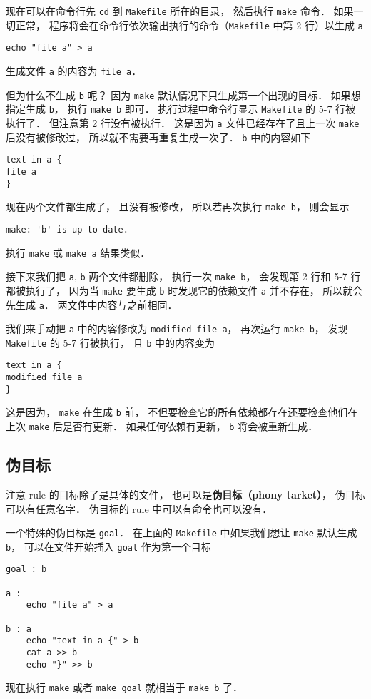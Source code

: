 现在可以在命令行先 \lstinline|cd| 到 \lstinline|Makefile| 所在的目录， 然后执行 \lstinline|make| 命令． 如果一切正常， 程序将会在命令行依次输出执行的命令（\lstinline|Makefile| 中第 2 行）以生成 \lstinline|a|
\begin{lstlisting}
echo "file a" > a
\end{lstlisting}
生成文件 \lstinline|a| 的内容为 \lstinline|file a|．

但为什么不生成 \lstinline|b| 呢？ 因为 \lstinline|make| 默认情况下只生成第一个出现的目标． 如果想指定生成 \lstinline|b|， 执行 \lstinline|make b| 即可． 执行过程中命令行显示 \lstinline|Makefile| 的 5-7 行被执行了． 但注意第 2 行没有被执行． 这是因为 \lstinline|a| 文件已经存在了且上一次 \lstinline|make| 后没有被修改过， 所以就不需要再重复生成一次了． \lstinline|b| 中的内容如下
\begin{lstlisting}
text in a {
file a
}
\end{lstlisting}

现在两个文件都生成了， 且没有被修改， 所以若再次执行 \lstinline|make b|， 则会显示
\begin{lstlisting}
make: 'b' is up to date.
\end{lstlisting}
执行 \lstinline|make| 或 \lstinline|make a| 结果类似．

接下来我们把 \lstinline|a|, \lstinline|b| 两个文件都删除， 执行一次 \lstinline|make b|， 会发现第 2 行和 5-7 行都被执行了， 因为当 \lstinline|make| 要生成 \lstinline|b| 时发现它的依赖文件 \lstinline|a| 并不存在， 所以就会先生成 \lstinline|a|． 两文件中内容与之前相同．

我们来手动把 \lstinline|a| 中的内容修改为 \lstinline|modified file a|， 再次运行 \lstinline|make b|， 发现 \lstinline|Makefile| 的 5-7 行被执行， 且 \lstinline|b| 中的内容变为
\begin{lstlisting}
text in a {
modified file a
}
\end{lstlisting}
这是因为， \lstinline|make| 在生成 \lstinline|b| 前， 不但要检查它的所有依赖都存在还要检查他们在上次 \lstinline|make| 后是否有更新． 如果任何依赖有更新， \lstinline|b| 将会被重新生成．

\subsection{伪目标}
注意 rule 的目标除了是具体的文件， 也可以是\textbf{伪目标（phony tarket）}， 伪目标可以有任意名字． 伪目标的 rule 中可以有命令也可以没有．

一个特殊的伪目标是 \lstinline|goal|． 在上面的 \lstinline|Makefile| 中如果我们想让 \lstinline|make| 默认生成 \lstinline|b|， 可以在文件开始插入 \lstinline|goal| 作为第一个目标
\begin{lstlisting}
goal : b

a :
	echo "file a" > a

b : a
	echo "text in a {" > b
	cat a >> b
	echo "}" >> b
\end{lstlisting}
现在执行 \lstinline|make| 或者 \lstinline|make goal| 就相当于 \lstinline|make b| 了．

